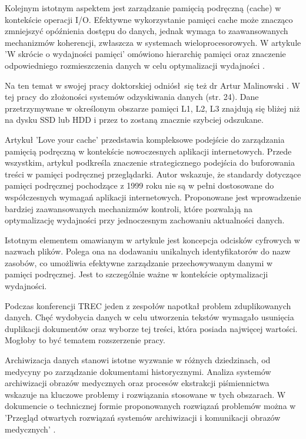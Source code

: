 Kolejnym istotnym aspektem jest zarządzanie pamięcią podręczną (cache) w 
kontekście operacji I/O. Efektywne wykorzystanie pamięci cache może znacząco 
zmniejszyć opóźnienia dostępu do danych, jednak wymaga to zaawansowanych 
mechanizmów koherencji, zwłaszcza w systemach wieloprocesorowych. W artykule 
'W skrócie o wydajności pamięci' omówiono hierarchię pamięci oraz znaczenie 
odpowiedniego rozmieszczenia danych w celu optymalizacji wydajności \cite{bib:internet:IntelMemoryPerformance}.

Na ten temat w swojej pracy doktorskiej odniósł się też dr Artur Malinowski \cite{bib:internet:ArturMalinowskiIO}.
W tej pracy do złożoności systemów odzyskiwania danych (str. 24). Dane 
przetrzymywane w określonym obszarze pamięci L1, L2, L3 znajdują się
bliżej niż na dysku SSD lub HDD i przez to zostaną znacznie szybciej odszukane. 

Artykuł 'Love your cache' \cite{bib:internet:TwojaPamiećPodręczna} przedstawia
kompleksowe podejście do zarządzania 
pamięcią podręczną w kontekście nowoczesnych aplikacji internetowych. Przede 
wszystkim, artykuł podkreśla znaczenie strategicznego podejścia do buforowania 
treści w pamięci podręcznej przeglądarki. Autor wskazuje, że standardy 
dotyczące pamięci podręcznej pochodzące z 1999 roku nie są w pełni dostosowane 
do współczesnych wymagań aplikacji internetowych. Proponowane jest wprowadzenie
bardziej zaawansowanych mechanizmów kontroli, które pozwalają na optymalizację
wydajności przy jednoczesnym zachowaniu aktualności danych.

Istotnym elementem omawianym w artykule jest koncepcja odcisków cyfrowych w
nazwach plików. Polega ona na dodawaniu unikalnych identyfikatorów do nazw 
zasobów, co umożliwia efektywne zarządzanie przechowywanym danymi w pamięci 
podręcznej. Jest to szczególnie ważne w kontekście optymalizacji wydajności.

Podczas konferencji TREC \cite{bib:konferencja:TRECDuplicates} jeden z zespołów 
napotkał problem zduplikowanych danych. Chęć wydobycia danych w celu utworzenia
tekstów wymagało usunięcia duplikacji dokumentów oraz wyborze tej treści,
która posiada najwięcej wartości. Mogłoby to być tematem rozszerzenie pracy. 

Archiwizacja danych stanowi istotne wyzwanie w różnych dziedzinach, od medycyny 
po zarządzanie dokumentami historycznymi. Analiza systemów archiwizacji obrazów
medycznych oraz procesów ekstrakcji piśmiennictwa wskazuje na kluczowe problemy
i rozwiązania stosowane w tych obszarach. W dokumencie o technicznej formie
proponowanych rozwiązań problemów można w 'Przegląd otwartych rozwiązań systemów 
archiwizacji i komunikacji obrazów medycznych' \cite{bib:internet:ArchiwizacjaDanychMedycznych}.


